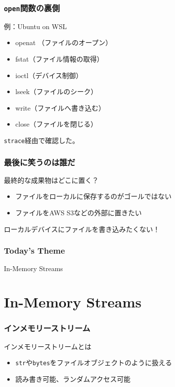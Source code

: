 \documentclass[aspectratio=169,dvipdfmx,14pt,notheorems]{beamer}
\theoremstyle{definition}
\begin{document}
\begin{frame}[fragile]\frametitle{\texttt{open}関数の裏側}

\begin{exampleblock}{例：Ubuntu on WSL}
\begin{itemize}
\item openat （ファイルのオープン）
\item fstat（ファイル情報の取得）
\item ioctl（デバイス制御）
\item lseek（ファイルのシーク）
\item write（ファイルへ書き込む）
\item close（ファイルを閉じる）
\end{itemize}
\end{exampleblock}
\texttt{strace}経由で確認した。

\end{frame}

\begin{frame}\frametitle{最後に笑うのは誰だ}
\begin{block}{最終的な成果物はどこに置く？}
\begin{itemize}
\item ファイルをローカルに保存するのがゴールではない
\item ファイルをAWS S3などの外部に置きたい
\end{itemize}
\end{block}
ローカルデバイスにファイルを書き込みたくない！
\end{frame}

\begin{frame}\frametitle{Today's Theme}
\begin{center}
\huge{In-Memory Streams}
\end{center}
\end{frame}

\section{In-Memory Streams}

\begin{frame}\frametitle{インメモリーストリーム}
\begin{block}{インメモリーストリームとは}
\begin{itemize}
\item \texttt{str}や\texttt{bytes}をファイルオブジェクトのように扱える
\item 読み書き可能、ランダムアクセス可能
\end{itemize}
\end{block}
\end{frame}
\end{document}
